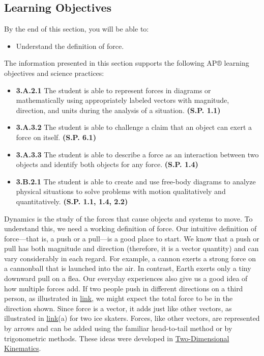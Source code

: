 \documentclass[
]{book}
\providecommand{\tightlist}{%
  \setlength{\itemsep}{0pt}\setlength{\parskip}{0pt}}
\newenvironment{learning-objectives}{}{}
\begin{document}
\hypertarget{fs-id2243190}{}
\begin{learning-objectives}

\hypertarget{learning-objectives-12}{%
\subsection{Learning Objectives}\label{learning-objectives-12}}

By the end of this section, you will be able to:

\begin{itemize}
\tightlist
\item
  Understand the definition of force.
\end{itemize}

The information presented in this section supports the following AP®
learning objectives and science practices:

\begin{itemize}
\tightlist
\item
  \textbf{3.A.2.1} The student is able to represent forces in diagrams or
  mathematically using appropriately labeled vectors with magnitude,
  direction, and units during the analysis of a situation. \textbf{(S.P.
  1.1)}
\item
  \textbf{3.A.3.2} The student is able to challenge a claim that an object
  can exert a force on itself. \textbf{(S.P. 6.1)}
\item
  \textbf{3.A.3.3} The student is able to describe a force as an
  interaction between two objects and identify both objects for any
  force. \textbf{(S.P. 1.4)}
\item
  \textbf{3.B.2.1} The student is able to create and use free-body diagrams
  to analyze physical situations to solve problems with motion
  qualitatively and quantitatively. \textbf{(S.P. 1.1, 1.4, 2.2)}
\end{itemize}

\end{learning-objectives}

\protect\hypertarget{import-auto-id2134480}{}{Dynamics} is the study of the
forces that cause objects and systems to move. To understand this, we
need a working definition of force. Our intuitive definition of
\protect\hypertarget{import-auto-id2712510}{}{force}---that is, a push or a
pull---is a good place to start. We know that a push or pull has both
magnitude and direction (therefore, it is a vector quantity) and can
vary considerably in each regard. For example, a cannon exerts a strong
force on a cannonball that is launched into the air. In contrast, Earth
exerts only a tiny downward pull on a flea. Our everyday experiences
also give us a good idea of how multiple forces add. If two people push
in different directions on a third person, as illustrated in
\protect\hyperlink{import-auto-id2379809}{link}, we might expect
the total force to be in the direction shown. Since force is a vector,
it adds just like other vectors, as illustrated in
\protect\hyperlink{import-auto-id2379809}{link}(a) for two ice
skaters. Forces, like other vectors, are represented by arrows and can
be added using the familiar head-to-tail method or by trigonometric
methods. These ideas were developed in \href{/m54779}{Two-Dimensional
Kinematics}.
\end{document}
